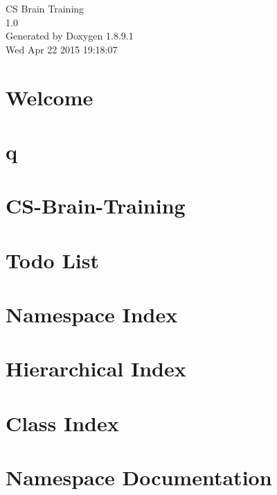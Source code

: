 \documentclass[twoside]{book}
\newcommand{\+}{\discretionary{\mbox{\scriptsize$\hookleftarrow$}}{}{}}
\newcommand{\clearemptydoublepage}{%
  \newpage{\pagestyle{empty}\cleardoublepage}%
}
\begin{document}
\begin{titlepage}
\vspace*{7cm}
\begin{center}%
{\Large C\+S Brain Training \\[1ex]\large 1.\+0 }\\
\vspace*{1cm}
{\large Generated by Doxygen 1.8.9.1}\\
\vspace*{0.5cm}
{\small Wed Apr 22 2015 19:18:07}\\
\end{center}
\end{titlepage}
\clearemptydoublepage
\tableofcontents
\clearemptydoublepage
{}

\chapter{Welcome}
\label{index}
\chapter{q}
\label{md_q}

\chapter{C\+S-\/\+Brain-\/\+Training}
\label{md__r_e_a_d_m_e}

\chapter{Todo List}
\label{todo}

\chapter{Namespace Index}

\chapter{Hierarchical Index}

\chapter{Class Index}

\chapter{Namespace Documentation}


\end{document}
